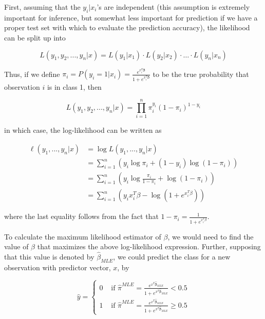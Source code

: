 First, assuming that the $y_i | x_i$'s are independent (this assumption is extremely important for inference, but somewhat less important for prediction if we have a proper test set with which to evaluate the prediction accuracy), the likelihood can be split up into

$$L(y_1, y_2, ..., y_n | x) = L(y_1 | x_1) \cdot L(y_2 | x_2)  \cdot \dots \cdot L(y_n | x_n) $$

Thus, if we define $\pi_i = P(y_i = 1 | x_i) = \frac{e^{x_i^T \boldsymbol{\beta}} }{1 + e^{x_i^T \boldsymbol{\beta}}} $ to be the true probability that observation $i$ is in class 1, then 

$$L(y_1, y_2, ..., y_n | x) = \prod_{i=1}^n \pi_i^{y_i} ( 1 - \pi_i)^{1 - y_i} $$


in which case, the log-likelihood can be written as

\begin{align*}
\ell(y_1, ..., y_n | x) & = \log L(y_1, ..., y_n | x)\\
& = \sum_{i=1}^n \left( y_i \log \pi_i + ( 1- y_i) \log ( 1 - \pi_i)\right)\\
& = \sum_{i=1}^n \left( y_i \log \frac{\pi_i }{1- \pi_i} + \log (1 - \pi_i) \right)\\
& = \sum_{i=1}^n \left( y_i x_i^T \beta - \log \left( 1 + e^{x_i^T \beta} \right) \right) 
\end{align*}


where the last equality follows from the fact that $1 - \pi_i = \frac{1}{1 + e^{x_i^T \beta}}$.



To calculate the maximum likelihood estimator of $\beta$, we would need to find the value of $\beta$ that maximizes the above log-likelihood expression. Further, supposing that this value is denoted by $\hat{\beta}_{MLE}$, we could predict the class for a new observation with predictor vector, $x$, by

$$\hat{y} = \begin{cases} 0 & \text{ if } \hat{\pi}^{MLE} = \frac{e^{x^T \boldsymbol{\hat{\beta}}_{MLE}} }{1 + e^{x^T \boldsymbol{\hat{\beta}}_{MLE}}} < 0.5 \\ 
 1 & \text{ if } \hat{\pi}^{MLE} = \frac{e^{x^T \boldsymbol{\hat{\beta}}_{MLE}} }{1 + e^{x^T \boldsymbol{\hat{\beta}}_{MLE}}} \geq 0.5\end{cases}$$



